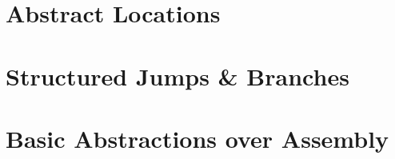 \documentclass[main.tex]{subfiles}
\begin{document}
\begin{figure}
	\label{fig:gcccstack}
\end{figure}


\section{Abstract Locations}

\section{Structured Jumps \& Branches}

\section{Basic Abstractions over Assembly}

\biblio{}
\onlyinsubfile{\glsaddall\printglossaries}
\end{document}
